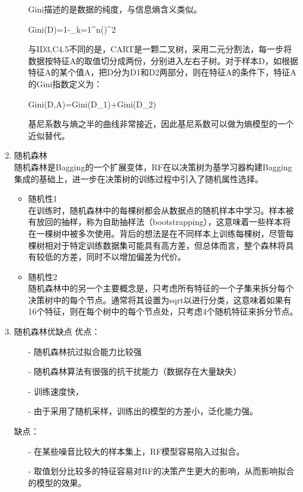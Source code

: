 \begin{enumerate}
\begin{itemize}
		Gini描述的是数据的纯度，与信息熵含义类似。
		\begin{flalign}
		Gini(D)=1-\sum_{k=1}^{n}()^2
		\end{flalign}
		与ID3,C4.5不同的是，CART是一颗二叉树，采用二元分割法，每一步将数据按特征A的取值切分成两份，分别进入左右子树。对于样本D，如根据特征A的某个值A，把D分为D1和D2两部分，则在特征A的条件下，特征A的Gini指数定义为：
		\begin{flalign}
		Gini(D,A)=Gini(D_1)+Gini(D_2)
		\end{flalign}
		基尼系数与熵之半的曲线非常接近，因此基尼系数可以做为熵模型的一个近似替代。
	\end{itemize}
	\item 随机森林\\
	随机森林是Bagging的一个扩展变体，RF在以决策树为基学习器构建Bagging集成的基础上，进一步在决策树的训练过程中引入了随机属性选择。
	\begin{itemize}
		\item 随机性1\\
		在训练时，随机森林中的每棵树都会从数据点的随机样本中学习。样本被有放回的抽样，称为自助抽样法（bootstrapping），这意味着一些样本将在一棵树中被多次使用。背后的想法是在不同样本上训练每棵树，尽管每棵树相对于特定训练数据集可能具有高方差，但总体而言，整个森林将具有较低的方差，同时不以增加偏差为代价。\\
		\item 随机性2\\
		随机森林中的另一个主要概念是，只考虑所有特征的一个子集来拆分每个决策树中的每个节点。通常将其设置为sqrt以进行分类，这意味着如果有16个特征，则在每个树中的每个节点处，只考虑4个随机特征来拆分节点。\\
	\end{itemize}
	\item 随机森林优缺点
	优点：
	\begin{itemize}		
		\item[-] 随机森林抗过拟合能力比较强
		\item[-] 随机森林算法有很强的抗干扰能力（数据存在大量缺失）
		\item[-] 训练速度快，
		\item[-] 由于采用了随机采样，训练出的模型的方差小，泛化能力强。
	\end{itemize}
	缺点：
	\begin{itemize}	
		\item[-] 在某些噪音比较大的样本集上，RF模型容易陷入过拟合。
		\item[-] 取值划分比较多的特征容易对RF的决策产生更大的影响，从而影响拟合的模型的效果。

\end{itemize}
\end{enumerate}
